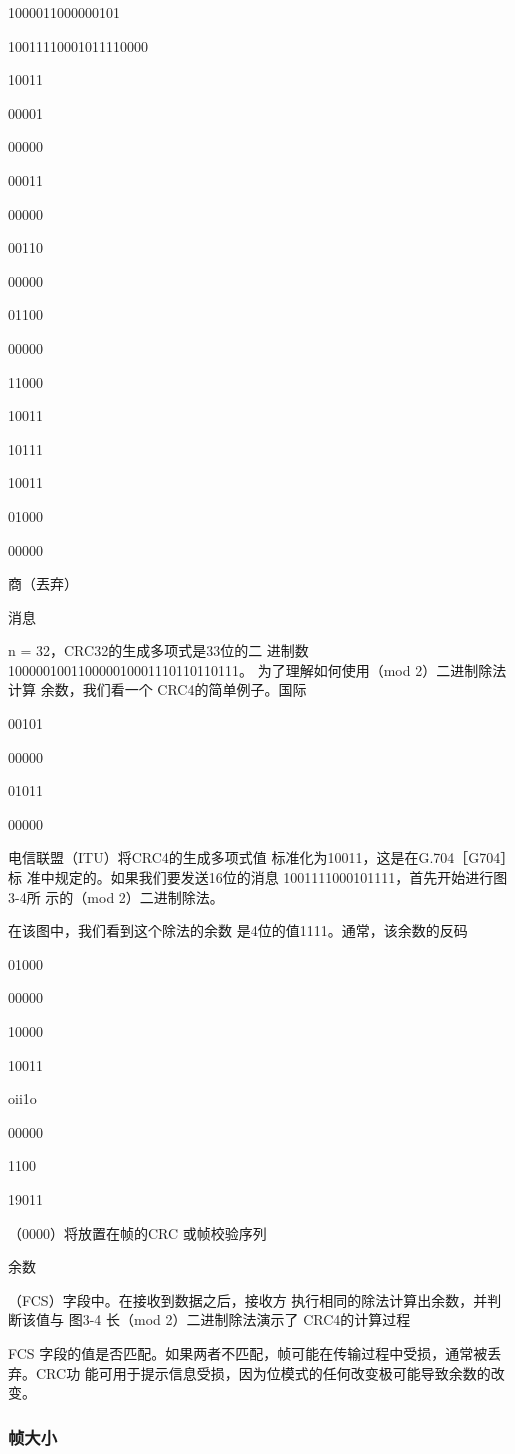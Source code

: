 1000011000000101

10011110001011110000

10011

00001

00000

00011

00000

00110

00000

01100

00000

11000

10011

10111

10011

01000

00000

商（丟弃）

消息

n = 32，CRC32的生成多项式是33位的二
进制数100000100110000010001110110110111。
为了理解如何使用（mod 2）二进制除法计算
余数，我们看一个 CRC4的简单例子。国际

00101

00000

01011

00000

电信联盟（ITU）将CRC4的生成多项式值
标准化为10011，这是在G.704［G704］标
准中规定的。如果我们要发送16位的消息
1001111000101111，首先开始进行图3-4所
示的（mod 2）二进制除法。

在该图中，我们看到这个除法的余数
是4位的值1111。通常，该余数的反码

01000

00000

10000

10011

oii1o

00000

1100

19011

（0000）将放置在帧的CRC 或帧校验序列

余数

（FCS）字段中。在接收到数据之后，接收方
执行相同的除法计算出余数，并判断该值与
图3-4 长（mod 2）二进制除法演示了
CRC4的计算过程


FCS 字段的值是否匹配。如果两者不匹配，帧可能在传输过程中受损，通常被丢弃。CRC功
能可用于提示信息受损，因为位模式的任何改变极可能导致余数的改变。

\subsubsection{帧大小}

